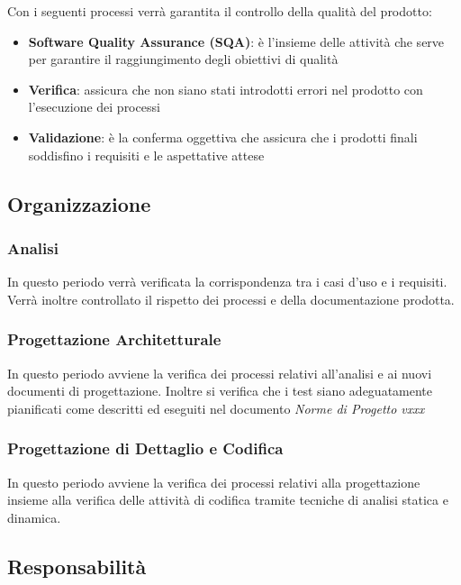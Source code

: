 Con i seguenti processi verrà garantita il controllo della qualità del prodotto:
\begin{itemize}
\item \textbf{Software Quality Assurance (SQA)}: è l'insieme delle attività che serve per garantire il raggiungimento degli obiettivi di qualità
\item \textbf{Verifica}: assicura che non siano stati introdotti errori nel prodotto con l'esecuzione dei processi 
\item  \textbf{Validazione}: è la conferma oggettiva che assicura che i prodotti finali soddisfino i requisiti e le aspettative attese
\end{itemize}

\subsection{Organizzazione}


\subsubsection{Analisi}

In questo periodo verrà verificata la corrispondenza tra i casi d'uso e i requisiti. Verrà inoltre controllato il rispetto dei processi e della documentazione prodotta.

\subsubsection{Progettazione Architetturale}

In questo periodo avviene la verifica dei processi relativi all'analisi e
ai nuovi documenti di progettazione. Inoltre si verifica che i test
siano adeguatamente pianificati come descritti ed eseguiti nel documento \emph{Norme
di Progetto vxxx}

\subsubsection{Progettazione di Dettaglio e Codifica}

In questo periodo avviene la verifica dei processi relativi alla
progettazione insieme alla verifica delle attività di codifica tramite
tecniche di analisi statica e dinamica. 


\subsection{Responsabilità}

